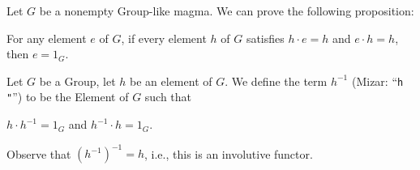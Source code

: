 \documentclass{article}
\begin{document}
  
Let $G$ be a nonempty Group-like magma. We can prove the following proposition:
\begin{thm}
\item\label{group1:4} For any element $e$ of $G$, if every element $h$
  of $G$ satisfies $h\cdot e=h$ and $e\cdot h=h$, then $e=1_{G}$.
\end{thm}

\begin{definition}
Let $G$ be a Group, let $h$ be an element of $G$.
We define the term $h^{-1}$ (Mizar: ``\verb#h "#'') to be the Element of
$G$ such that
\begin{defn}
\item $h\cdot h^{-1}=1_{G}$ and $h^{-1}\cdot h = 1_{G}$.
\end{defn}
Observe that $(h^{-1})^{-1}=h$, i.e., this is an involutive functor.
\end{definition}
\end{document}
